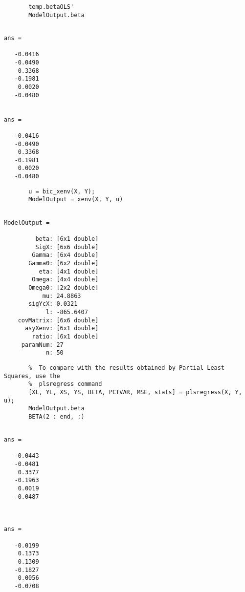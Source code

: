 \documentclass[a4paper,11pt,openany]{memoir}
\begin{document}
\begin{verbatim}       temp.betaOLS'
       ModelOutput.beta\end{verbatim}

 \color{lightgray}\ttfamily \begin{verbatim}

ans =

   -0.0416
   -0.0490
    0.3368
   -0.1981
    0.0020
   -0.0480


ans =

   -0.0416
   -0.0490
    0.3368
   -0.1981
    0.0020
   -0.0480
\end{verbatim} \rmfamily
\color{black}
    
\begin{verbatim}       u = bic_xenv(X, Y);
       ModelOutput = xenv(X, Y, u)\end{verbatim}

\color{lightgray}\ttfamily \begin{verbatim}

ModelOutput = 

         beta: [6x1 double]
         SigX: [6x6 double]
        Gamma: [6x4 double]
       Gamma0: [6x2 double]
          eta: [4x1 double]
        Omega: [4x4 double]
       Omega0: [2x2 double]
           mu: 24.8863
       sigYcX: 0.0321
            l: -865.6407
    covMatrix: [6x6 double]
      asyXenv: [6x1 double]
        ratio: [6x1 double]
     paramNum: 27
            n: 50
\end{verbatim} \rmfamily
\color{black}
    
\begin{verbatim}       %  To compare with the results obtained by Partial Least Squares, use the 
       %  plsregress command
       [XL, YL, XS, YS, BETA, PCTVAR, MSE, stats] = plsregress(X, Y, u);
       ModelOutput.beta
       BETA(2 : end, :)\end{verbatim}
    

        \color{lightgray}\ttfamily \begin{verbatim}

ans =

   -0.0443
   -0.0481
    0.3377
   -0.1963
    0.0019
   -0.0487



ans =

   -0.0199
    0.1373
    0.1309
   -0.1827
    0.0056
   -0.0708

\end{verbatim} \rmfamily
\color{black}
\end{document}
